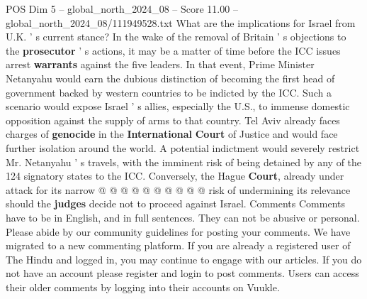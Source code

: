 \begin{textsample}{POS Dim 5 – global\_north\_2024\_08 – Score 11.00 – global\_north\_2024\_08/111949528.txt}
What are the implications for Israel from U.K. ' s current stance?
In the wake of the removal of Britain ' s objections to the \textbf{prosecutor} ' s actions, it may be a matter of time before the ICC issues arrest \textbf{warrants} against the five leaders.
In that event, Prime Minister Netanyahu would earn the dubious distinction of becoming the first head of government backed by western countries to be indicted by the ICC.
Such a scenario would expose Israel ' s allies, especially the U.S., to immense domestic opposition against the supply of arms to that country.
Tel Aviv already faces charges of \textbf{genocide} in the \textbf{International} \textbf{Court} of Justice and would face further isolation around the world.
A potential indictment would severely restrict Mr.
Netanyahu ' s travels, with the imminent risk of being detained by any of the 124 signatory states to the ICC.
Conversely, the Hague \textbf{Court}, already under attack for its narrow @ @ @ @ @ @ @ @ @ @ risk of undermining its relevance should the \textbf{judges} decide not to proceed against Israel.
Comments Comments have to be in English, and in full sentences.
They can not be abusive or personal.
Please abide by our community guidelines for posting your comments.
We have migrated to a new commenting platform.
If you are already a registered user of The Hindu and logged in, you may continue to engage with our articles.
If you do not have an account please register and login to post comments.
Users can access their older comments by logging into their accounts on Vuukle.

\end{textsample}
